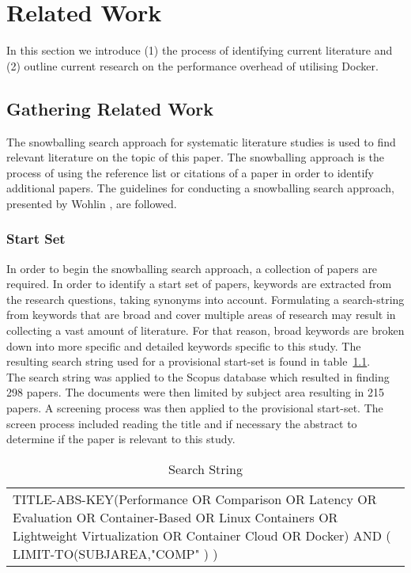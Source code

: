 \iffalse  \fi
\chapter{Related Work}
In this section we introduce (1) the process of identifying current literature and (2) outline current research on the performance overhead of utilising Docker.

\section{Gathering Related Work}
The snowballing search approach for systematic literature studies is used to find relevant literature on the topic of this paper. The snowballing approach is the process of using the reference list or citations of a paper in order to identify additional papers. The guidelines for conducting a snowballing search approach, presented by Wohlin \cite{Wohlin}, are followed. 

\subsection{Start Set}
In order to begin the snowballing search approach, a collection of papers are required. In order to identify a start set of papers, keywords are extracted from the research questions, taking synonyms into account. Formulating a search-string from keywords that are broad and cover multiple areas of research may result in collecting a vast amount of literature. For that reason, broad keywords are broken down into more specific and detailed keywords specific to this study. The resulting search string used for a provisional start-set is found in table~\ref{search-string}. \\

The search string was applied to the Scopus \cite{scopus} database which resulted in finding 298 papers. The documents were then limited by subject area resulting in 215 papers. A screening process was then applied to the provisional start-set. The screen process included reading the title and if necessary the abstract to determine if the paper is relevant to this study. 

\begin{table}[h]
\centering
\begin{tabular}{p{15cm}}
TITLE-ABS-KEY(Performance OR Comparison OR Latency OR Evaluation OR Container-Based OR Linux Containers OR Lightweight Virtualization OR Container Cloud OR Docker) AND ( LIMIT-TO(SUBJAREA,"COMP" ) )
\end{tabular}
\caption{Search String}
\label{search-string}
\end{table}



